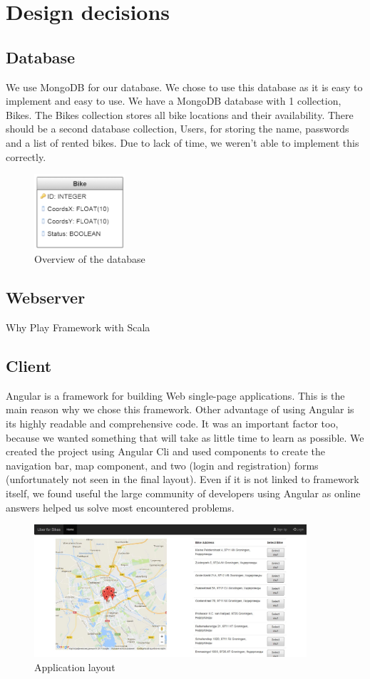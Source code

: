 \section{Design decisions}

\subsection{Database}
We use MongoDB for our database. We chose to use this database as it is easy to implement and easy to use. We have
a MongoDB database with 1 collection, Bikes. The Bikes collection stores all bike locations and their availability. There should be a second database collection, Users, for storing the name, passwords and a list of rented bikes. Due to lack of time, we weren't able to implement this correctly.  


    \begin{figure}[H]
		\centering
		\includegraphics[width=0.3\textwidth]{images/db-structure.png}
		\caption{Overview of the database}
		\label{database}
	\end{figure}
	
	
\subsection{Webserver}
Why Play Framework with Scala

\subsection{Client}
Angular is a framework for building Web single-page applications. This is the main reason why we chose this framework. Other advantage of using Angular is its highly readable and comprehensive code. It was an important factor too, because we wanted something that will take as little time to learn as possible. We created the project using Angular Cli and used components to create the navigation bar, map component, and two (login and registration) forms (unfortunately not seen in the final layout). Even if it is not linked to framework itself, we found useful the large community of developers using Angular as online answers helped us solve most encountered problems.

\begin{figure}[H]
		\centering
		\includegraphics[width=0.9\textwidth]{images/screenshot.png}
		\caption{Application layout}
		\label{front-end}
	\end{figure}
